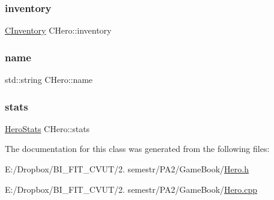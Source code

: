 \mbox{\label{class_c_hero_a711765d0b222d1e8126a0a5199042f5c}} 
\subsubsection{\texorpdfstring{inventory}{inventory}}
{\footnotesize\ttfamily \mbox{\hyperlink{class_c_inventory}{C\+Inventory}} C\+Hero\+::inventory\hspace{0.3cm}{\ttfamily [protected]}}

\mbox{\label{class_c_hero_aef47575d9fb80e636bc99f7402a09169}} 
\subsubsection{\texorpdfstring{name}{name}}
{\footnotesize\ttfamily std\+::string C\+Hero\+::name\hspace{0.3cm}{\ttfamily [protected]}}

\mbox{\label{class_c_hero_ad0f762c5159f5ad1eebec205a700496a}} 
\subsubsection{\texorpdfstring{stats}{stats}}
{\footnotesize\ttfamily \mbox{\hyperlink{struct_hero_stats}{Hero\+Stats}} C\+Hero\+::stats\hspace{0.3cm}{\ttfamily [protected]}}



The documentation for this class was generated from the following files\+:\begin{DoxyCompactItemize}
\item 
E\+:/\+Dropbox/\+B\+I\+\_\+\+F\+I\+T\+\_\+\+C\+V\+U\+T/2. semestr/\+P\+A2/\+Game\+Book/\mbox{\hyperlink{_hero_8h}{Hero.\+h}}\item 
E\+:/\+Dropbox/\+B\+I\+\_\+\+F\+I\+T\+\_\+\+C\+V\+U\+T/2. semestr/\+P\+A2/\+Game\+Book/\mbox{\hyperlink{_hero_8cpp}{Hero.\+cpp}}\end{DoxyCompactItemize}
